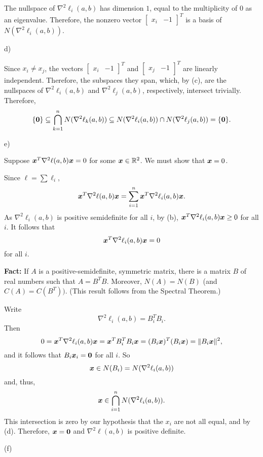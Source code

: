\documentclass[12pt]{amsart}
\begin{document}
    The nullspace of $\nabla^2\ell_i(a, b)$ has dimension $1$,
    equal to the multiplicity of 0 as an eigenvalue.
    Therefore, the nonzero vector $\begin{bmatrix}x_i& -1\end{bmatrix}^T$
    is a basis of $N(\nabla^2\ell_i(a, b))$.

    d)

    Since $x_i\neq x_j$, the vectors $\begin{bmatrix}x_i& -1\end{bmatrix}^T$
    and $\begin{bmatrix}x_j& -1\end{bmatrix}^T$ are linearly independent.
    Therefore, the subspaces they span, which, by (c), are the nullspaces of
    $\nabla^2\ell_i(a, b)$ and $\nabla^2\ell_j(a, b)$, respectively, intersect trivially.
    Therefore,
    \[
        \{\boldsymbol{0}\}\subseteq \bigcap_{k=1}^n N(\nabla^2\ell_k(a, b))
        \subseteq N(\nabla^2\ell_i(a, b)) \cap N(\nabla^2\ell_j(a, b))
        = \{\boldsymbol{0}\}.
    \]

    e)

    Suppose $\boldsymbol{x}^T\nabla^2\ell(a, b)\boldsymbol{x}=0$ for some $\boldsymbol{x}\in\mathbb{R}^2$.
    We must show that $\boldsymbol{x}=0$.

    Since $\ell = \sum\ell_i$,
    \[
        \boldsymbol{x}^T\nabla^2\ell(a, b)\boldsymbol{x} = \sum_{i=1}^n \boldsymbol{x}^T\nabla^2\ell_i(a, b)\boldsymbol{x}.
    \]
    As $\nabla^2\ell_i(a, b)$ is positive semidefinite for all $i$, by (b),
    $\boldsymbol{x}^T\nabla^2\ell_i(a, b)\boldsymbol{x}\geq 0$ for all $i$. It follows that
    \[
        \boldsymbol{x}^T\nabla^2\ell_i(a, b)\boldsymbol{x} = 0
    \]
    for all $i$.

    \textbf{Fact:} If $A$ is a positive-semidefinite, symmetric matrix, there is a
    matrix $B$ of real numbers such that $A = B^TB$. Moreover, $N(A)=N(B)$
    (and $C(A)=C(B^T))$. (This result follows from the Spectral Theorem.)

    Write
    \[
        \nabla^2\ell_i(a, b) = B_i^TB_i.
    \]
    Then
    \[
        0 = \boldsymbol{x}^T\nabla^2\ell_i(a, b)\boldsymbol{x} =\boldsymbol{x}^T B_i^TB_i\boldsymbol{x} = (B_i\boldsymbol{x})^T(B_i\boldsymbol{x}) = \|B_i\boldsymbol{x}\|^2,
    \]
    and it follows that $B_i\boldsymbol{x}_i=\boldsymbol{0}$ for all $i$.
    So
    \[
        \boldsymbol{x} \in N(B_i)=N(\nabla^2\ell_i(a, b))
    \]
    and, thus,
    \[
        \boldsymbol{x} \in \bigcap_{i=1}^nN(\nabla^2\ell_i(a, b)).
    \]
    This intersection is zero by our hypothesis that the $x_i$ are not all equal, and by (d).
    Therefore, $\boldsymbol{x}=\boldsymbol{0}$ and $\nabla^2\ell(a, b)$ is positive definite.

    (f)
\end{document}
